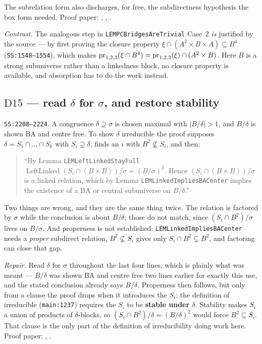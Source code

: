 The subrelation form also discharges, for free, the subdirectness hypothesis
the box form needed. Proof paper: ,
, .

\emph{Contrast.} The analogous step in \texttt{LEMPCBridgesAreTrivial} Case~2
\emph{is} justified by the source --- by first proving the closure property
$\xi\cap(A^{2}\times B\times A)\subseteq B^{4}$ (\texttt{SS:1548--1554}), which
makes $\operatorname*{pr}_{1,2,3}(\xi\cap B^{4})=\operatorname*{pr}_{1,2,3}(\xi)\cap(A^{2}\times B)$.
Here $B$ is a strong subuniverse rather than a linkedness block, no closure
property is available, and absorption has to do the work instead.

\subsection{$\mathrm D{15}$ --- read $\delta$ for $\sigma$, and restore stability}
\label{sec:D15}

\texttt{SS:2208--2224}. A congruence $\delta\supseteq\sigma$ is chosen maximal
with $|B/\delta|>1$, and $B/\delta$ is shown BA and centre free. To show
$\delta$ irreducible the proof supposes $\delta=S_{1}\cap\dots\cap S_{k}$ with
$S_{i}\supsetneq\delta$, finds an $i$ with $B^{2}\not\subseteq S_{i}$, and then:

\begin{quote}\small
``By Lemma \texttt{LEMLeftLinkedStayFull}
$\operatorname{LeftLinked}(S_{i}\cap(B\times B))/\sigma=(B/\sigma)^{2}$. Hence
$(S_{i}\cap(B\times B))/\sigma$ is a linked relation, which by Lemma
\texttt{LEMLinkedImpliesBACenter} implies the existence of a BA or central
subuniverse on $B/\delta$.''
\end{quote}

Two things are wrong, and they are the same thing twice. The relation is
factored by $\sigma$ while the conclusion is about $B/\delta$; those do not
match, since $(S_{i}\cap B^{2})/\sigma$ lives on $B/\sigma$. And properness is
not established: \texttt{LEMLinkedImpliesBACenter} needs a \emph{proper}
subdirect relation, $B^{2}\not\subseteq S_{i}$ gives only
$S_{i}\cap B^{2}\subsetneq B^{2}$, and factoring can close that gap.

\emph{Repair.} Read $\delta$ for $\sigma$ throughout the last four lines, which
is plainly what was meant --- $B/\delta$ was shown BA and centre free two lines
earlier for exactly this use, and the stated conclusion already says
$B/\delta$. Properness then follows, but only from a clause the proof drops
when it introduces the $S_{i}$: the definition of irreducible
(\texttt{main:1237}) requires the $S_{i}$ to be \textbf{stable under $\delta$}.
Stability makes $S_{i}$ a union of products of $\delta$-blocks, so
$(S_{i}\cap B^{2})/\delta=(B/\delta)^{2}$ would force $B^{2}\subseteq S_{i}$.
That clause is the only part of the definition of irreducibility doing work
here. Proof paper: , .

